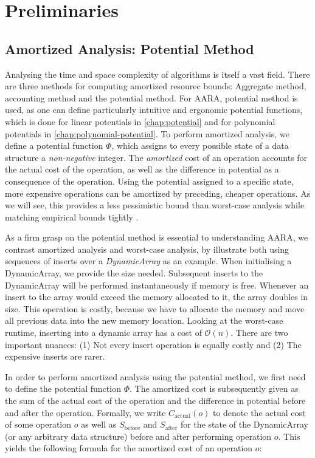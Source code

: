 \chapter{Preliminaries} \label{chap:preliminaries}

\section{Amortized Analysis: Potential Method}
Analysing the time and space complexity of algorithms is itself a vast field. There are three methods for computing amortized resourec bounds: Aggregate method, accounting method and the potential method. For AARA, potential method is used, as one can define particularly intuitive and ergonomic potential functions, which is done for linear potentials in \ref{chap:potential} and for polynomial potentials in \ref{chap:polynomial-potential}.
To perform amortized analysis, we define a potential function \(\Phi\), which assigns to every possible state of a data structure a \emph{non-negative} integer. The \emph{amortized} cost of an operation accounts for the actual cost of the operation, as well as the difference in potential as a consequence of the operation. Using the potential assigned to a specific state, more expensive operations can be amortized by preceding, cheaper operations. As we will see, this provides a less pessimistic bound than worst-case analysis while matching empirical bounds tightly . 

As a firm grasp on the potential method is essential to understanding AARA, we contrast amortized analysis and worst-case analysis, by illustrate both using sequences of inserts over a \emph{DynamicArray} as an example. 
When initialising a DynamicArray, we provide the size needed. Subsequent inserts to the DynamicArray will be performed instantaneously if memory is free. Whenever an insert to the array would exceed the memory allocated to it, the array doubles in size.
This operation is costly, because we have to allocate the memory and move all previous data into the new memory location. Looking at the worst-case runtime, inserting into a dynamic array has a cost of \(\mathcal{O}(n)\). There are two important nuances: (1) Not every insert operation is equally costly and (2) The expensive inserts are rarer.

In order to perform amortized analysis using the potential method, we first need to define the potential function \(\Phi\). The amortized cost is subsequently given as the sum of the actual cost of the operation and the difference in potential before and after the operation. Formally, we write \(C_{\text{actual}}(o)\) to denote the actual cost of some operation \(o\) as well as \(S_{\text{before}}\) and \(S_{\text{after}}\) for the state of the DynamicArray (or any arbitrary data structure) before and after performing operation \(o\). This yields the following formula for the amortized cost of an operation \(o\):

